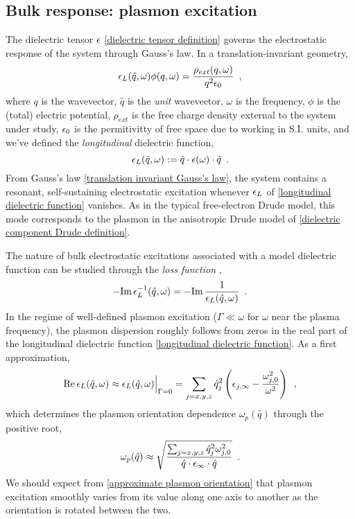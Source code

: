 \subsection{Bulk response: plasmon excitation}

The dielectric tensor $\epsilon$ \eqref{dielectric tensor definition} governs the electrostatic response of the system through Gauss's law.  In a translation-invariant geometry,
\begin{equation}
    \label{translation invariant Gauss's law}
    \epsilon_L(\hat q,\omega) \phi(q,\omega) = \frac{\rho_{ext}(q,\omega)}{q^2 \epsilon_0}\,\,\,,
\end{equation}
where $q$ is the wavevector, $\hat q$ is the {\it unit} wavevector, $\omega$ is the frequency, $\phi$ is the (total) electric potential, $\rho_{ext}$ is the free charge density external to the system under study, $\epsilon_0$ is the permitivitty of free space due to working in S.I. units, and we've defined the {\it longitudinal} dielectric function,
\begin{equation}
    \label{longitudinal dielectric function}
    \epsilon_L(\hat q,\omega) := \hat q\cdot \epsilon(\omega)\cdot \hat q\,\,\,.
\end{equation}
From Gauss's law \eqref{translation invariant Gauss's law}, the system contains a resonant, self-sustaining electrostatic excitation whenever $\epsilon_L$ of \eqref{longitudinal dielectric function} vanishes.  As in the typical free-electron Drude model, this mode corresponds to the plasmon in the anisotropic Drude model of \eqref{dielectric component Drude definition}.

The nature of bulk electrostatic excitations associated with a model dielectric function can be studied through the {\it loss function} ,
\begin{equation}
    \label{bulk loss function}
    -\text{Im}\, \epsilon^{-1}_L(\hat q,\omega) = -\text{Im}\,\frac{1}{\epsilon_L(\hat q,\omega)}
    \,\,\,.
\end{equation}
In the regime of well-defined plasmon excitation ($\Gamma \ll \omega$ for $\omega$ near the plasma frequency), the plasmon dispersion roughly follows from zeros in the real part of the longitudinal dielectric function \eqref{longitudinal dielectric function}.  As a first approximation,
\begin{equation}
    \label{real part of longitudinal dielectric function without damping}
    \text{Re}\,\epsilon_L(\hat q, \omega) \approx \epsilon_L(\hat q, \omega)\Big|_{\Gamma = 0}
    =
    \sum_{j=x,y,z} \hat q_j^2\left(\epsilon_{j,\infty} - \frac{\omega_{j,0}^2}{\omega^2}\right)
    \,\,\,,
\end{equation}
which determines the plasmon orientation dependence $\omega_p(\hat q)$ through the positive root,
\begin{equation}
    \label{approximate plasmon orientation}
    \omega_p(\hat q) \approx 
    \sqrt{\frac{\sum_{j=x,y,z} \hat q_j^2 \omega_{j,0}^2}{\hat q \cdot \epsilon_{\infty} \cdot \hat q}}
    \,\,\,.
\end{equation}
We should expect from \eqref{approximate plasmon orientation} that plasmon excitation smoothly varies from its value along one axis to another as the orientation is rotated between the two.

